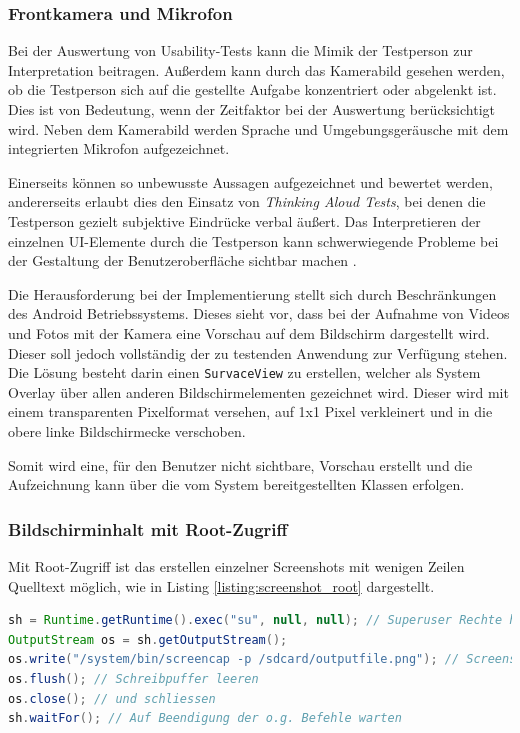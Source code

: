 \subsubsection{Frontkamera und Mikrofon}
Bei der Auswertung von Usability-Tests kann die Mimik der Testperson zur Interpretation beitragen.
Außerdem kann durch das Kamerabild gesehen werden, ob die Testperson sich auf die gestellte Aufgabe konzentriert oder abgelenkt ist.
Dies ist von Bedeutung, wenn der Zeitfaktor bei der Auswertung berücksichtigt wird.
Neben dem Kamerabild werden Sprache und Umgebungsgeräusche mit dem integrierten Mikrofon aufgezeichnet.

Einerseits können so unbewusste Aussagen aufgezeichnet und bewertet werden, andererseits erlaubt dies den Einsatz von \emph{Thinking Aloud Tests}, bei denen die Testperson gezielt subjektive Eindrücke verbal äußert. Das Interpretieren der einzelnen \ac{UI}-Elemente durch die Testperson kann schwerwiegende Probleme bei der Gestaltung der Benutzeroberfläche sichtbar machen \cite[vgl.][73\psq]{usability_engineering_software_developers}. 

Die Herausforderung bei der Implementierung stellt sich durch Beschränkungen des Android Betriebssystems.
Dieses sieht vor, dass bei der Aufnahme von Videos und Fotos mit der Kamera eine Vorschau auf dem Bildschirm dargestellt wird.
Dieser soll jedoch vollständig der zu testenden Anwendung zur Verfügung stehen.
Die Lösung besteht darin einen \texttt{SurvaceView} zu erstellen, welcher als System Overlay über allen anderen Bildschirmelementen gezeichnet wird. 
Dieser wird mit einem transparenten Pixelformat versehen, auf 1x1 Pixel verkleinert und in die obere linke Bildschirmecke verschoben.

Somit wird eine, für den Benutzer nicht sichtbare, Vorschau erstellt und die Aufzeichnung kann über die vom System bereitgestellten Klassen erfolgen.


\subsubsection{Bildschirminhalt mit Root-Zugriff}
Mit Root-Zugriff ist das erstellen einzelner Screenshots mit wenigen Zeilen Quelltext möglich, wie in Listing \ref{listing:screenshot_root} dargestellt.

\begin{lstlisting}[label=listing:screenshot_root,language=Java, caption=Screenshot Aufnahme mit Root-Zugriff]
sh = Runtime.getRuntime().exec("su", null, null); // Superuser Rechte holen
OutputStream os = sh.getOutputStream();
os.write("/system/bin/screencap -p /sdcard/outputfile.png"); // Screenshot erstellen
os.flush(); // Schreibpuffer leeren 
os.close(); // und schliessen
sh.waitFor(); // Auf Beendigung der o.g. Befehle warten
\end{lstlisting}

